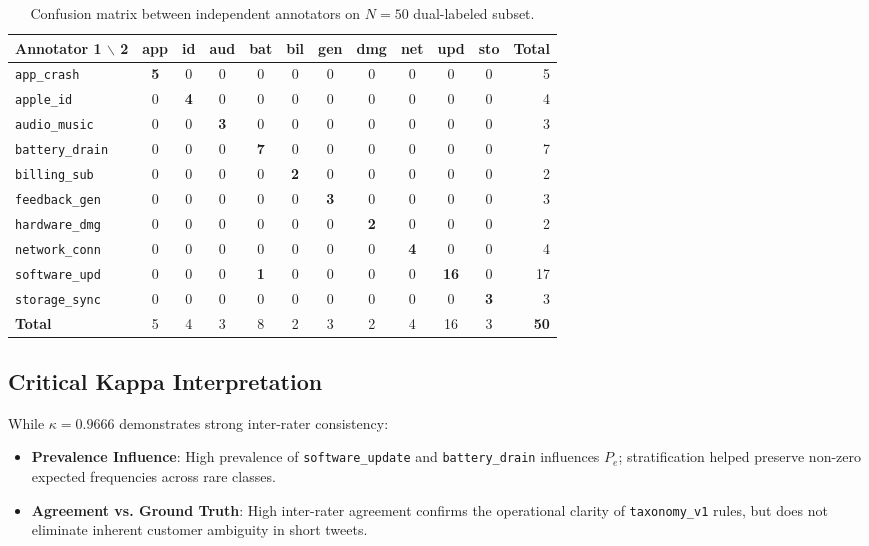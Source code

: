 \documentclass[11pt,a4paper]{article}
\begin{document}
\begin{table}[ht]
\centering
\small
\begin{tabularx}{\textwidth}{lccccccccccr}
\toprule
\textbf{Annotator 1 $\backslash$ 2} & \textbf{app} & \textbf{id} & \textbf{aud} & \textbf{bat} & \textbf{bil} & \textbf{gen} & \textbf{dmg} & \textbf{net} & \textbf{upd} & \textbf{sto} & \textbf{Total} \\
\midrule
\texttt{app\_crash} & \textbf{5} & 0 & 0 & 0 & 0 & 0 & 0 & 0 & 0 & 0 & 5 \\
\texttt{apple\_id} & 0 & \textbf{4} & 0 & 0 & 0 & 0 & 0 & 0 & 0 & 0 & 4 \\
\texttt{audio\_music} & 0 & 0 & \textbf{3} & 0 & 0 & 0 & 0 & 0 & 0 & 0 & 3 \\
\texttt{battery\_drain} & 0 & 0 & 0 & \textbf{7} & 0 & 0 & 0 & 0 & 0 & 0 & 7 \\
\texttt{billing\_sub} & 0 & 0 & 0 & 0 & \textbf{2} & 0 & 0 & 0 & 0 & 0 & 2 \\
\texttt{feedback\_gen} & 0 & 0 & 0 & 0 & 0 & \textbf{3} & 0 & 0 & 0 & 0 & 3 \\
\texttt{hardware\_dmg} & 0 & 0 & 0 & 0 & 0 & 0 & \textbf{2} & 0 & 0 & 0 & 2 \\
\texttt{network\_conn} & 0 & 0 & 0 & 0 & 0 & 0 & 0 & \textbf{4} & 0 & 0 & 4 \\
\texttt{software\_upd} & 0 & 0 & 0 & \textbf{1} & 0 & 0 & 0 & 0 & \textbf{16} & 0 & 17 \\
\texttt{storage\_sync} & 0 & 0 & 0 & 0 & 0 & 0 & 0 & 0 & 0 & \textbf{3} & 3 \\
\midrule
\textbf{Total} & 5 & 4 & 3 & 8 & 2 & 3 & 2 & 4 & 16 & 3 & \textbf{50} \\
\bottomrule
\end{tabularx}
\caption{Confusion matrix between independent annotators on $N=50$ dual-labeled subset.}
\label{tab:confusion_matrix}
\end{table}

\subsection{Critical Kappa Interpretation}
While $\kappa = 0.9666$ demonstrates strong inter-rater consistency:
\begin{itemize}[leftmargin=*]
    \item \textbf{Prevalence Influence}: High prevalence of \texttt{software\_update} and \texttt{battery\_drain} influences $P_e$; stratification helped preserve non-zero expected frequencies across rare classes.
    \item \textbf{Agreement vs. Ground Truth}: High inter-rater agreement confirms the operational clarity of \texttt{taxonomy\_v1} rules, but does not eliminate inherent customer ambiguity in short tweets.
\end{itemize}
\end{document}
